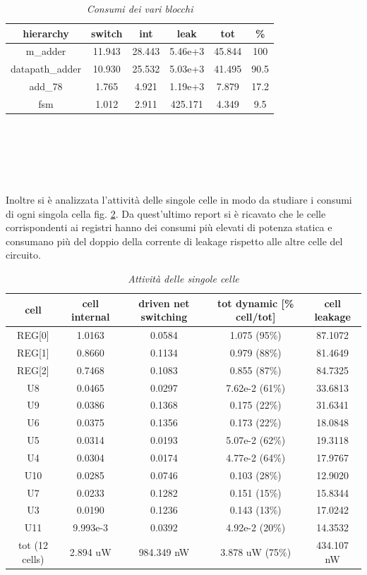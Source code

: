 \begin{table}[!h]\footnotesize
	\centering
	\begin{tabular}{|c|c|c|c|c|c|}
		\hline
		\textbf{hierarchy} & \textbf{switch} & \textbf{int} & \textbf{leak}& \textbf{tot}& \textbf{\%}\\
		\hline
		m\_adder & 11.943 & 28.443 & 5.46e+3 & 45.844 & 100\\
		\hline
		datapath\_adder & 10.930 & 25.532 & 5.03e+3 & 41.495 & 90.5\\
		\hline
		add\_78 & 1.765 & 4.921  & 1.19e+3 & 7.879 & 17.2\\
		\hline
		fsm & 1.012 & 2.911 & 425.171 & 4.349 & 9.5\\
		\hline
	\end{tabular}
	\caption{\textit{Consumi dei vari blocchi}}
\label{pot}
\end{table} \\
\\
\\
\\
\\
Inoltre si è  analizzata l’attività delle singole celle in modo da studiare i consumi di ogni singola cella fig. \ref{cellpot}. Da quest’ultimo report si è ricavato che le celle corrispondenti ai registri hanno dei consumi più elevati di potenza statica e consumano più del doppio della corrente di leakage rispetto alle altre celle del circuito.
\begin{table}[!h]\footnotesize
	\centering
	\begin{tabular}{|c|c|c|c|c|}
		\hline
		\textbf{cell} & \textbf{cell internal} & \textbf{driven net switching} & \textbf{tot dynamic [\% cell/tot]}& \textbf{cell leakage}\\
		\hline
		REG[0] & 1.0163 & 0.0584 & 1.075 (95\%) & 87.1072\\
		\hline
		REG[1] & 0.8660 & 0.1134 & 0.979 (88\%) & 81.4649\\
		\hline
		REG[2] & 0.7468 & 0.1083 & 0.855 (87\%) & 84.7325\\
		\hline
		U8 & 0.0465 & 0.0297 & 7.62e-2 (61\%) & 33.6813\\
		\hline
		U9 & 0.0386 & 0.1368 & 0.175 (22\%) & 31.6341\\
		\hline
		U6 & 0.0375 & 0.1356 & 0.173 (22\%) & 18.0848\\
		\hline
		U5 & 0.0314 & 0.0193 & 5.07e-2 (62\%) & 19.3118\\
		\hline
		U4 & 0.0304 & 0.0174 & 4.77e-2 (64\%) & 17.9767\\
		\hline
		U10 & 0.0285 & 0.0746 & 0.103 (28\%) & 12.9020\\
		\hline
		U7 & 0.0233 & 0.1282 & 0.151 (15\%) & 15.8344\\
		\hline
		U3 & 0.0190 & 0.1236 & 0.143 (13\%) & 17.0242\\
		\hline
		U11 & 9.993e-3 & 0.0392 & 4.92e-2 (20\%) & 14.3532\\
		\hline
		\hline
		tot (12 cells) & 2.894 uW & 984.349 nW & 3.878 uW (75\%) & 434.107 nW\\
		\hline 
	\end{tabular}
	\caption{\textit{Attività delle singole celle}}
\label{cellpot}
\end{table} \\
